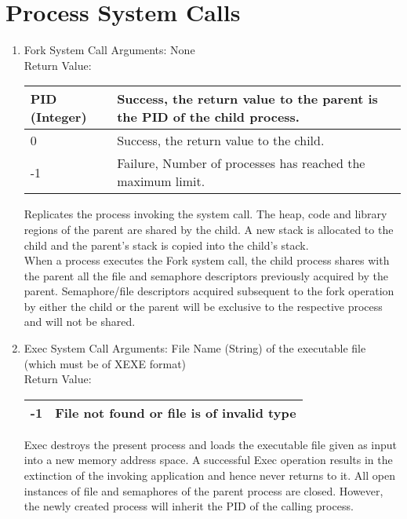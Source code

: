 \section{Process System Calls}
\begin{enumerate}
\item{Fork System Call}
Arguments: None\\
Return Value:
\FloatBarrier \begin{table}[H]
\centering
\begin{tabular}{|l|l|}
\hline
PID (Integer)  	& Success, the return value to the parent is the PID of the child process. \\ \hline
0  		& Success, the return value to the child. \\ \hline 
-1 		& Failure, Number of processes has reached the maximum limit.\\ \hline
\end{tabular}
\end{table} \FloatBarrier 

Replicates the process invoking the system call. The heap, code and library regions of the parent are shared by the child. A new stack is allocated to the child and the parent's stack is copied into the child's stack.
\\
When a process executes the Fork system call, the child process shares with the parent all the file and semaphore descriptors previously acquired by the parent. Semaphore/file descriptors acquired subsequent to the fork operation by either the child or the parent will be exclusive to the respective process and will not be shared.
 

\item{Exec System Call}
Arguments: File Name (String) of the executable file (which must be of XEXE format)\\
Return Value:
\FloatBarrier \begin{table}[H]
\centering
\begin{tabular}{|l|l|}
\hline
-1 		& File not found or file is of invalid type \\ \hline
\end{tabular}
\end{table} \FloatBarrier 

Exec destroys the present process and loads the executable file given as input into a new memory address space. A successful Exec operation results in the extinction of the invoking application and hence never returns to it. All open instances of file and semaphores of the parent process are closed. However, the newly created process will inherit the PID of the calling process.



\end{enumerate}
